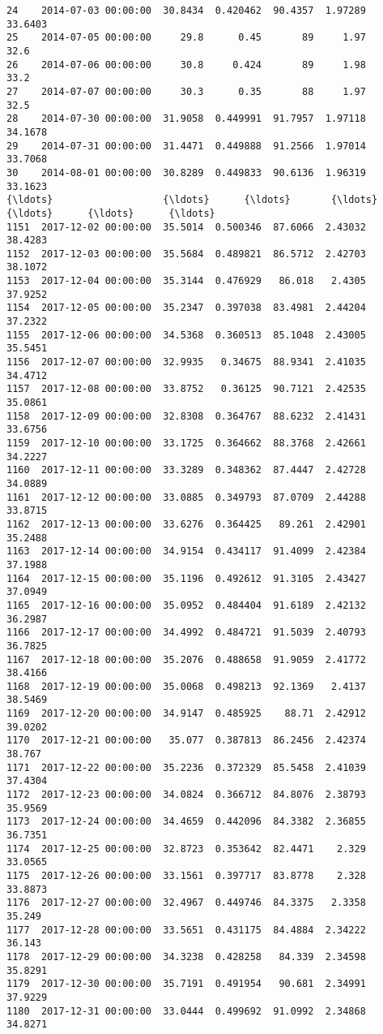 \documentclass[11pt]{article}
\begin{document}
\begin{tcolorbox}[breakable, size=fbox, boxrule=.5pt, pad at break*=1mm, opacityfill=0]
\begin{Verbatim}[commandchars=\\\{\}]
24    2014-07-03 00:00:00  30.8434  0.420462  90.4357  1.97289  33.6403
25    2014-07-05 00:00:00     29.8      0.45       89     1.97     32.6
26    2014-07-06 00:00:00     30.8     0.424       89     1.98     33.2
27    2014-07-07 00:00:00     30.3      0.35       88     1.97     32.5
28    2014-07-30 00:00:00  31.9058  0.449991  91.7957  1.97118  34.1678
29    2014-07-31 00:00:00  31.4471  0.449888  91.2566  1.97014  33.7068
30    2014-08-01 00:00:00  30.8289  0.449833  90.6136  1.96319  33.1623
{\ldots}                   {\ldots}      {\ldots}       {\ldots}      {\ldots}      {\ldots}      {\ldots}
1151  2017-12-02 00:00:00  35.5014  0.500346  87.6066  2.43032  38.4283
1152  2017-12-03 00:00:00  35.5684  0.489821  86.5712  2.42703  38.1072
1153  2017-12-04 00:00:00  35.3144  0.476929   86.018   2.4305  37.9252
1154  2017-12-05 00:00:00  35.2347  0.397038  83.4981  2.44204  37.2322
1155  2017-12-06 00:00:00  34.5368  0.360513  85.1048  2.43005  35.5451
1156  2017-12-07 00:00:00  32.9935   0.34675  88.9341  2.41035  34.4712
1157  2017-12-08 00:00:00  33.8752   0.36125  90.7121  2.42535  35.0861
1158  2017-12-09 00:00:00  32.8308  0.364767  88.6232  2.41431  33.6756
1159  2017-12-10 00:00:00  33.1725  0.364662  88.3768  2.42661  34.2227
1160  2017-12-11 00:00:00  33.3289  0.348362  87.4447  2.42728  34.0889
1161  2017-12-12 00:00:00  33.0885  0.349793  87.0709  2.44288  33.8715
1162  2017-12-13 00:00:00  33.6276  0.364425   89.261  2.42901  35.2488
1163  2017-12-14 00:00:00  34.9154  0.434117  91.4099  2.42384  37.1988
1164  2017-12-15 00:00:00  35.1196  0.492612  91.3105  2.43427  37.0949
1165  2017-12-16 00:00:00  35.0952  0.484404  91.6189  2.42132  36.2987
1166  2017-12-17 00:00:00  34.4992  0.484721  91.5039  2.40793  36.7825
1167  2017-12-18 00:00:00  35.2076  0.488658  91.9059  2.41772  38.4166
1168  2017-12-19 00:00:00  35.0068  0.498213  92.1369   2.4137  38.5469
1169  2017-12-20 00:00:00  34.9147  0.485925    88.71  2.42912  39.0202
1170  2017-12-21 00:00:00   35.077  0.387813  86.2456  2.42374   38.767
1171  2017-12-22 00:00:00  35.2236  0.372329  85.5458  2.41039  37.4304
1172  2017-12-23 00:00:00  34.0824  0.366712  84.8076  2.38793  35.9569
1173  2017-12-24 00:00:00  34.4659  0.442096  84.3382  2.36855  36.7351
1174  2017-12-25 00:00:00  32.8723  0.353642  82.4471    2.329  33.0565
1175  2017-12-26 00:00:00  33.1561  0.397717  83.8778    2.328  33.8873
1176  2017-12-27 00:00:00  32.4967  0.449746  84.3375   2.3358   35.249
1177  2017-12-28 00:00:00  33.5651  0.431175  84.4884  2.34222   36.143
1178  2017-12-29 00:00:00  34.3238  0.428258   84.339  2.34598  35.8291
1179  2017-12-30 00:00:00  35.7191  0.491954   90.681  2.34991  37.9229
1180  2017-12-31 00:00:00  33.0444  0.499692  91.0992  2.34868  34.8271


\end{Verbatim}
\end{tcolorbox}
\end{document}

